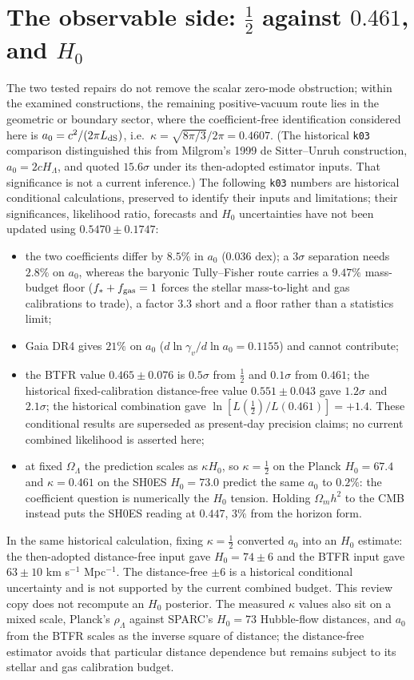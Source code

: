 \documentclass[11pt,letterpaper]{article}
\begin{document}
\section{The observable side: $\tfrac12$ against $0.461$, and $H_0$}
The two tested repairs do not remove the scalar zero-mode obstruction; within the examined constructions, the remaining positive-vacuum route lies in the geometric or boundary sector, where the coefficient-free identification considered here is $a_0=c^2/(2\pi L_{\rm dS})$, i.e.\ $\kappa=\sqrt{8\pi/3}/2\pi=0.4607$. (The historical \texttt{k03} comparison distinguished this from Milgrom's 1999 de Sitter--Unruh construction, $a_0=2cH_\Lambda$, and quoted $15.6\sigma$ under its then-adopted estimator inputs. That significance is not a current inference.) The following \texttt{k03} numbers are historical conditional calculations, preserved to identify their inputs and limitations; their significances, likelihood ratio, forecasts and $H_0$ uncertainties have not been updated using $0.5470\pm0.1747$:
\begin{itemize}
\item the two coefficients differ by $8.5\%$ in $a_0$ ($0.036$ dex); a $3\sigma$ separation needs $2.8\%$ on $a_0$, whereas the baryonic Tully--Fisher route carries a $9.47\%$ mass-budget floor ($f_*+f_{\rm gas}=1$ forces the stellar mass-to-light and gas calibrations to trade), a factor $3.3$ short and a floor rather than a statistics limit;
\item Gaia DR4 gives $21\%$ on $a_0$ ($d\ln\gamma_v/d\ln a_0=0.1155$) and cannot contribute;
\item the BTFR value $0.465\pm0.076$ is $0.5\sigma$ from $\tfrac12$ and $0.1\sigma$ from $0.461$; the historical fixed-calibration distance-free value $0.551\pm0.043$ gave $1.2\sigma$ and $2.1\sigma$; the historical combination gave $\ln[L(\tfrac12)/L(0.461)]=+1.4$. These conditional results are superseded as present-day precision claims; no current combined likelihood is asserted here;
\item at fixed $\Omega_\Lambda$ the prediction scales as $\kappa H_0$, so $\kappa=\tfrac12$ on the Planck $H_0=67.4$ and $\kappa=0.461$ on the SH0ES $H_0=73.0$ predict the same $a_0$ to $0.2\%$: the coefficient question is numerically the $H_0$ tension. Holding $\Omega_mh^2$ to the CMB instead puts the SH0ES reading at $0.447$, $3\%$ from the horizon form.
\end{itemize}
In the same historical calculation, fixing $\kappa=\tfrac12$ converted $a_0$ into an $H_0$ estimate: the then-adopted distance-free input gave $H_0=74\pm6$ and the BTFR input gave $63\pm10$ km s$^{-1}$ Mpc$^{-1}$. The distance-free $\pm6$ is a historical conditional uncertainty and is not supported by the current combined budget. This review copy does not recompute an $H_0$ posterior. The measured $\kappa$ values also sit on a mixed scale, Planck's $\rho_\Lambda$ against SPARC's $H_0=73$ Hubble-flow distances, and $a_0$ from the BTFR scales as the inverse square of distance; the distance-free estimator avoids that particular distance dependence but remains subject to its stellar and gas calibration budget.
\end{document}
